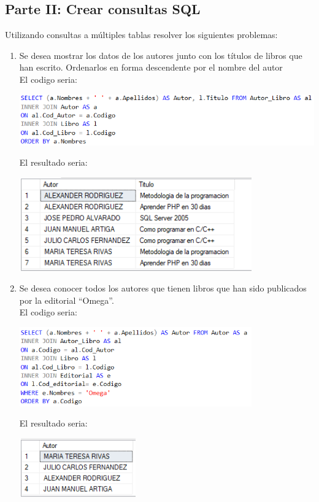 \documentclass[12pt,letterpaper]{article}
\newcommand\tab[1][1cm]{\hspace*{#1}}
\begin{document}
    \subsection{Parte II: Crear consultas SQL}
    Utilizando consultas a múltiples tablas resolver los siguientes problemas:
    \begin{enumerate}[\tab 1.]
        \item Se desea mostrar los datos de los autores junto con los títulos de libros que han escrito. Ordenarlos en forma descendente por el nombre del autor\\[0.1in]
        El codigo seria:
        \begin{center}
            \includegraphics[width=13cm]{./img/img7.1.png}
        \end{center}
        El resultado seria:
        \begin{center}
            \includegraphics[width=10cm]{./img/img7.2.png}
        \end{center}
        \item Se desea conocer todos los autores que tienen libros que han sido publicados por la editorial “Omega”.\\[0.1in]
        El codigo seria:
        \begin{center}
            \includegraphics[width=10cm]{./img/img8.1.png}
        \end{center}
        El resultado seria:
        \begin{center}
            \includegraphics[width=5cm]{./img/img8.2.png}

\end{center}
\end{enumerate}
\end{document}
